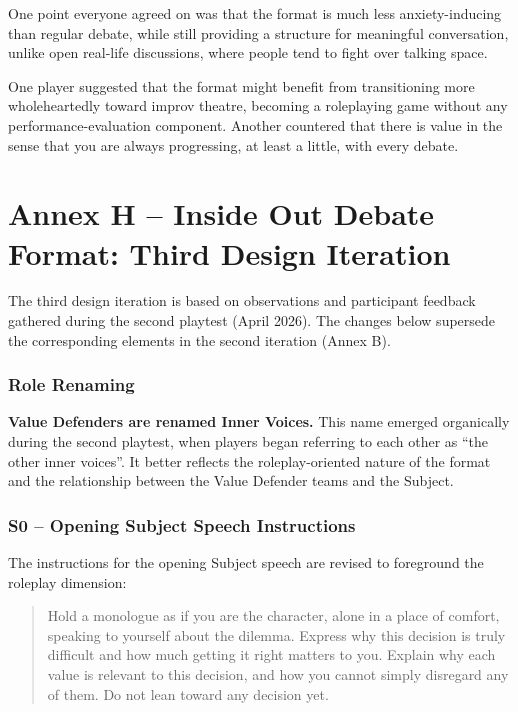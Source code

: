 \documentclass[12pt]{article}
\begin{document}
One point everyone agreed on was that the format is much less anxiety-inducing than regular debate, while still providing a structure for meaningful conversation, unlike open real-life discussions, where people tend to fight over talking space.

One player suggested that the format might benefit from transitioning more wholeheartedly toward improv theatre, becoming a roleplaying game without any performance-evaluation component. Another countered that there is value in the sense that you are always progressing, at least a little, with every debate.


\newpage
\section*{Annex H -- Inside Out Debate Format: Third Design Iteration}

The third design iteration is based on observations and participant feedback gathered during the second playtest (April 2026). The changes below supersede the corresponding elements in the second iteration (Annex B).

\subsubsection{Role Renaming}

\textbf{Value Defenders are renamed Inner Voices.} This name emerged organically during the second playtest, when players began referring to each other as ``the other inner voices''. It better reflects the roleplay-oriented nature of the format and the relationship between the Value Defender teams and the Subject.

\subsubsection{S0 -- Opening Subject Speech Instructions}

The instructions for the opening Subject speech are revised to foreground the roleplay dimension:

\begin{quote}
Hold a monologue as if you are the character, alone in a place of comfort, speaking to yourself about the dilemma. Express why this decision is truly difficult and how much getting it right matters to you. Explain why each value is relevant to this decision, and how you cannot simply disregard any of them. Do not lean toward any decision yet.
\end{quote}
\end{document}
